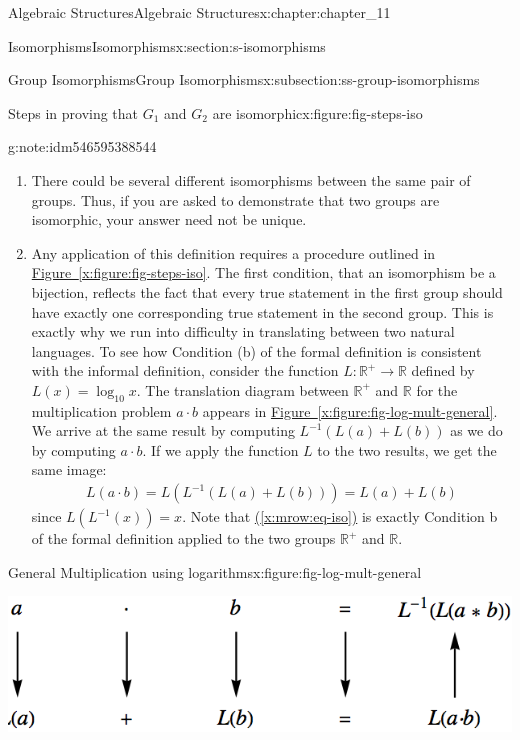 \documentclass[oneside,10pt,]{book}
\newcommand{\xreffont}{\relax}
\numberwithin{equation}{section}
\begin{document}
\begin{chapterptx}{Algebraic Structures}{}{Algebraic Structures}{}{}{x:chapter:chapter_11}
\begin{sectionptx}{Isomorphisms}{}{Isomorphisms}{}{}{x:section:s-isomorphisms}
\begin{subsectionptx}{Group Isomorphisms}{}{Group Isomorphisms}{}{}{x:subsection:ss-group-isomorphisms}
\begin{figureptx}{Steps in proving that \(G_1\) and \(G_2\) are isomorphic}{x:figure:fig-steps-iso}{}
\begin{image}{0.2}{0.6}{0.2}
\end{image}%
\tcblower
\end{figureptx}%
\begin{note}{}{g:note:idm546595388544}%
%
\begin{enumerate}[label=(\alph*)]
\item{}There could be several different isomorphisms between the same pair of groups. Thus, if you are asked to demonstrate that two groups are isomorphic, your answer need not be unique.%
\item{}Any application of this definition requires a procedure outlined in \hyperref[x:figure:fig-steps-iso]{Figure~{\xreffont\ref{x:figure:fig-steps-iso}}}. The first condition, that an isomorphism be a bijection, reflects the fact that every true statement in the first group should have exactly one corresponding true statement in the second group. This is exactly why we run into difficulty in translating between two natural languages. To see how Condition (b) of the formal definition is consistent with the informal definition, consider the function \(L:\mathbb{R}^+\to  \mathbb{R}\) defined by \(L(x)
= \log _{10}x\). The translation diagram between \(\mathbb{R}^+\) and \(\mathbb{R}\) for the multiplication problem \(a \cdot  b\) appears in \hyperref[x:figure:fig-log-mult-general]{Figure~{\xreffont\ref{x:figure:fig-log-mult-general}}}. We arrive at the same result by computing \(L^{-1} (L(a) + L(b))\) as we do by computing \(a \cdot  b\). If we apply the function \(L\) to the two results, we get the same image:%
\begin{gather}
L(a \cdot  b) = L\left(L^{-1}(L(a) + L(b))\right) = L(a) + L(b) \label{x:mrow:eq-iso}
\end{gather}
since \(L\left(L^{-1}(x)\right) = x\). Note that \hyperref[x:mrow:eq-iso]{({\xreffont\ref{x:mrow:eq-iso}})} is exactly Condition b of the formal definition applied to the two groups \(\mathbb{R}^+\) and \(\mathbb{R}\).%
\end{enumerate}
%
\end{note}
\begin{figureptx}{General Multiplication using logarithms}{x:figure:fig-log-mult-general}{}%
\begin{image}{0.15}{0.7}{0.15}%
\includegraphics[width=\linewidth]{images/fig-log-mult-general.png}

\end{image}
\end{figureptx}
\end{subsectionptx}
\end{sectionptx}
\end{chapterptx}
\end{document}
